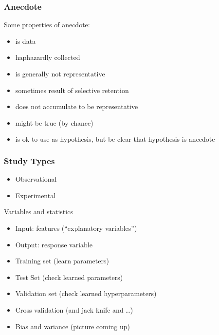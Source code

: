 \begin{frame}[t]
{    
  }

\end{frame}

\begin{frame}
  \frametitle{Anecdote}

  Some properties of anecdote:
  
  \begin{itemize}
  \item is data
  \item haphazardly collected
  \item is generally not representative
  \item sometimes result of selective retention
  \item does not accumulate to be representative
  \item might be true (by chance)
  \item is ok to use as hypothesis, but be clear that hypothesis is anecdote
  \end{itemize}
\end{frame}

\begin{frame}
  \frametitle{Study Types}

  \begin{itemize}
  \item Observational
  \item Experimental
  \end{itemize}
  
\end{frame}

\begin{frame}{Variables and statistics}
  \begin{itemize}
  \item Input: features (``explanatory variables'')
  \item Output: response variable
  \item Training set (learn parameters)
  \item Test Set (check learned parameters)
  \item Validation set (check learned hyperparameters)
  \item Cross validation (and jack knife and \dots)
  \item Bias and variance (picture coming up)
  \end{itemize}
\end{frame}

